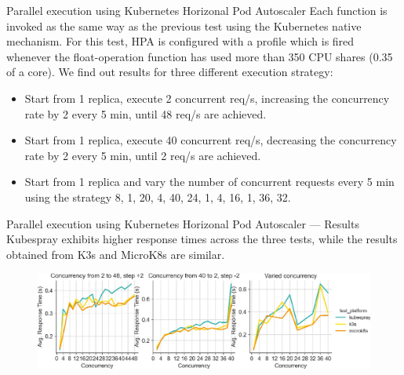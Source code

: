\begin{frame}{Parallel execution using Kubernetes Horizonal Pod Autoscaler}
Each function is invoked as the same way as the previous test using the Kubernetes native mechanism. For this test, HPA is configured with a profile which is fired whenever the float-operation function has used more than 350 CPU shares (0.35 of a core). \pause
We find out results for three different execution strategy:

\begin{itemize}
    \item Start from 1 replica, execute 2 concurrent req/s, increasing the concurrency rate by 2 every 5 min, until 48 req/s are achieved.
    \item Start from 1 replica, execute 40 concurrent req/s, decreasing the concurrency rate by 2 every 5 min, until 2 req/s are achieved.
    \item Start from 1 replica and vary the number of concurrent requests every 5 min using the strategy 8, 1, 20, 4, 40, 24, 1, 4, 16, 1, 36, 32.
\end{itemize}
\end{frame}


\begin{frame}{Parallel execution using Kubernetes Horizonal Pod Autoscaler  — Results}
Kubespray exhibits higher response times across the three tests, while the results obtained from K3s and MicroK8s are similar.

\begin{figure}
    \centering
    \includegraphics[width=1\linewidth]{static/11227_2022_4430_Fig8_HTML.jpg}
\end{figure}
\end{frame}
